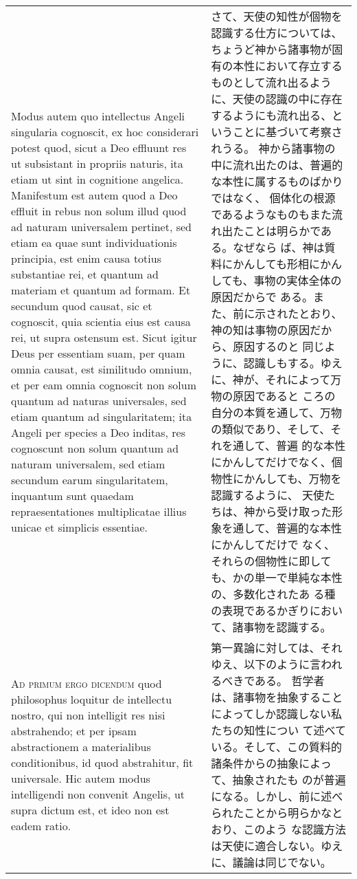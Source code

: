 \documentclass[10pt]{jsarticle} %
\begin{document}
\begin{longtable}{p{21em}p{21em}}
Modus autem quo intellectus Angeli singularia
cognoscit, ex hoc considerari potest quod, sicut a Deo effluunt res ut
subsistant in propriis naturis, ita etiam ut sint in cognitione
angelica. Manifestum est autem quod a Deo effluit in rebus non solum
illud quod ad naturam universalem pertinet, sed etiam ea quae sunt
individuationis principia, est enim causa totius substantiae rei, et
quantum ad materiam et quantum ad formam. Et secundum quod causat, sic
et cognoscit, quia scientia eius est causa rei, ut supra ostensum
est. Sicut igitur Deus per essentiam suam, per quam omnia causat, est
similitudo omnium, et per eam omnia cognoscit non solum quantum ad
naturas universales, sed etiam quantum ad singularitatem; ita Angeli per
species a Deo inditas, res cognoscunt non solum quantum ad naturam
universalem, sed etiam secundum earum singularitatem, inquantum sunt
quaedam repraesentationes multiplicatae illius unicae et simplicis
essentiae.


&

さて、天使の知性が個物を認識する仕方については、ちょうど神から諸事物が固
 有の本性において存立するものとして流れ出るように、天使の認識の中に存在
 するようにも流れ出る、ということに基づいて考察されうる。
 神から諸事物の中に流れ出たのは、普遍的な本性に属するものばかりではなく、
 個体化の根源であるようなものもまた流れ出たことは明らかである。なぜなら
 ば、神は質料にかんしても形相にかんしても、事物の実体全体の原因だからで
 ある。また、前に示されたとおり、神の知は事物の原因だから、原因するのと
 同じように、認識しもする。ゆえに、神が、それによって万物の原因であると
 ころの自分の本質を通して、万物の類似であり、そして、それを通して、普遍
 的な本性にかんしてだけでなく、個物性にかんしても、万物を認識するように、
 天使たちは、神から受け取った形象を通して、普遍的な本性にかんしてだけで
 なく、それらの個物性に即しても、かの単一で単純な本性の、多数化されたあ
 る種の表現であるかぎりにおいて、諸事物を認識する。
 
\\


{\scshape Ad primum ergo dicendum} quod philosophus
loquitur de intellectu nostro, qui non intelligit res nisi abstrahendo;
et per ipsam abstractionem a materialibus conditionibus, id quod
abstrahitur, fit universale. Hic autem modus intelligendi non convenit
Angelis, ut supra dictum est, et ideo non est eadem ratio.


&

 第一異論に対しては、それゆえ、以下のように言われるべきである。
 哲学者は、諸事物を抽象することによってしか認識しない私たちの知性につい
 て述べている。そして、この質料的諸条件からの抽象によって、抽象されたも
 のが普遍になる。しかし、前に述べられたことから明らかなとおり、このよう
 な認識方法は天使に適合しない。ゆえに、議論は同じでない。
 


\end{longtable}
\end{document}

